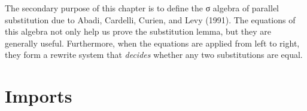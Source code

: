 The secondary purpose of this chapter is to define the σ algebra of
parallel substitution due to Abadi, Cardelli, Curien, and Levy (1991).
The equations of this algebra not only help us prove the substitution
lemma, but they are generally useful. Furthermore, when the equations
are applied from left to right, they form a rewrite system that
\emph{decides} whether any two substitutions are equal.

\hypertarget{imports}{%
\section{Imports}\label{imports}}

\begin{fence}
\begin{code}%
\>[0]\AgdaSpace{}%
\AgdaSpace{}%
\AgdaSpace{}%
\<%
\\
\>[0]\AgdaSpace{}%
\AgdaSpace{}%
\AgdaSpace{}%
\AgdaSymbol{(}\AgdaSymbol{;}\AgdaSpace{}%
\AgdaSymbol{;}\AgdaSpace{}%
\AgdaSymbol{;}\AgdaSpace{}%
\AgdaSymbol{;}\AgdaSpace{}%
\AgdaSymbol{;}\AgdaSpace{}%
\AgdaSymbol{)}\<%
\\
\>[0]\AgdaSpace{}%
\AgdaSpace{}%
\AgdaSpace{}%
\AgdaSymbol{(}\AgdaSymbol{;}\AgdaSpace{}%
\AgdaSymbol{;}\AgdaSpace{}%
\AgdaSymbol{;}\AgdaSpace{}%
\AgdaSymbol{)}\<%
\\
\>[0]\AgdaSpace{}%
\AgdaSpace{}%
\AgdaSpace{}%
\AgdaSpace{}%
\AgdaSymbol{(}\AgdaSymbol{)}\<%
\\
\>[0]%
\>[23I]\AgdaSpace{}%
\<%
\\
\>[.][@{}l@{}]\<[23I]%
\>[5]%
\>[25I]\AgdaSymbol{(}\AgdaSymbol{;}\AgdaSpace{}%
\AgdaSymbol{;}\AgdaSpace{}%
\AgdaSymbol{;}\AgdaSpace{}%

\end{code}
\end{fence}
